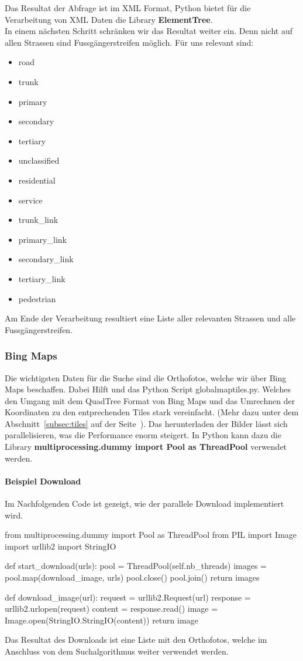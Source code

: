 Das Resultat der Abfrage ist im XML Format, Python bietet für die Verarbeitung von XML Daten die Library \textbf{ElementTree}.\\
In einem nächsten Schritt schränken wir das Resultat weiter ein. Denn nicht auf allen Strassen sind Fussgängerstreifen möglich. Für uns relevant sind:
\begin{itemize}
	\item road
	\item trunk
	\item primary
	\item secondary 
	\item tertiary
	\item unclassified
	\item residential
	\item service 
	\item trunk\_link 
	\item primary\_link 
	\item secondary\_link 
	\item tertiary\_link 
	\item pedestrian
\end{itemize}

Am Ende der Verarbeitung resultiert eine Liste aller relevanten Strassen und alle Fussgängerstreifen.

\subsubsection{Bing Maps}
Die wichtigsten Daten für die Suche sind die Orthofotos, welche wir über Bing Maps beschaffen. Dabei Hilft und das Python Script globalmaptiles.py. Welches den Umgang mit dem QuadTree Format von Bing Maps und das Umrechnen der Koordinaten zu den entprechenden Tiles stark vereinfacht. (Mehr dazu unter dem Abschnitt~\ref{subsec:tiles} auf der Seite~\pageref{subsec:tiles}). Das herunterladen der Bilder lässt sich parallelisieren, was die Performance enorm steigert. In Python kann dazu die Library \textbf{multiprocessing.dummy import Pool as ThreadPool} verwendet werden.

\paragraph{Beispiel Download} Im Nachfolgenden Code ist gezeigt, wie der parallele Download implementiert wird. \\
\begin{python}
from multiprocessing.dummy import Pool as ThreadPool
from PIL import Image
import urllib2
import StringIO

def start_download(urls):
     pool = ThreadPool(self.nb_threads)       
     images = pool.map(download_image, urls)
     pool.close()
     pool.join()
     return images

def download_image(url):
    request = urllib2.Request(url)
    response = urllib2.urlopen(request)
    content = response.read()
    image = Image.open(StringIO.StringIO(content))
    return image

\end{python}

Das Resultat des Downloads ist eine Liste mit den Orthofotos, welche im Anschluss von dem Suchalgorithmus weiter verwendet werden.



